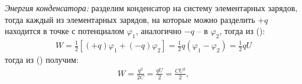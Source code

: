 \documentclass[__main__.tex]{subfiles}
\begin{document}
\emph{Энергия конденсатора:} разделим конденсатор на систему элементарных зарядов, тогда каждый из элементарных зарядов, на которые можно разделить $+q$ находится в точке с потенциалом $\varphi_1$, аналогично $-q$ -- в $\varphi_2$, тогда из ():
\begin{gather}
W
=
\frac{1}{2}\left[(+q)\varphi_{1}+(-q)\varphi_{2}\right]
=
\frac{1}{2}q(\varphi_1-\varphi_2)=\frac{1}{2}qU
\end{gather}
тогда из () получим:
\begin{gather}
W=\frac{q^2}{2C}=\frac{qU}{2}=\frac{CU^2}{2},
\end{gather}
\end{document}
